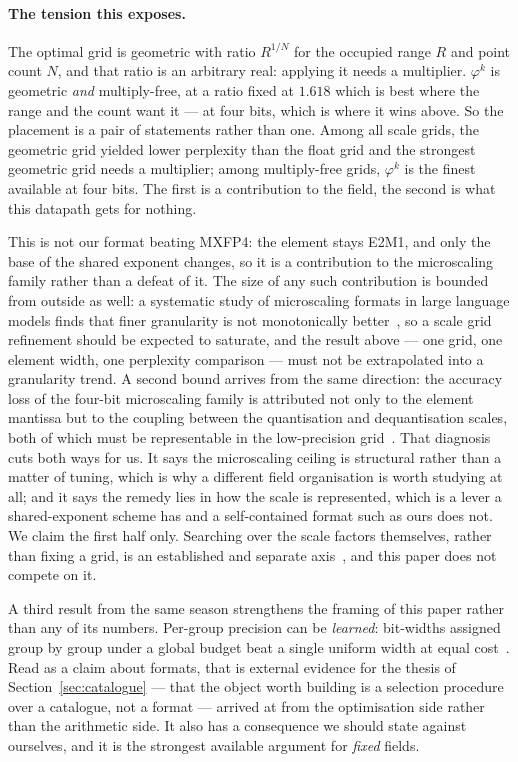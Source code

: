 \documentclass[11pt]{article}
\theoremstyle{definition}
\begin{document}
\paragraph{The tension this exposes.} The optimal grid is geometric with ratio
$R^{1/N}$ for the occupied range $R$ and point count $N$, and that ratio is an
arbitrary real: applying it needs a multiplier. $\varphi^{k}$ is geometric
\emph{and} multiply-free, at a ratio fixed at $1.618$ which is best where the
range and the count want it --- at four bits, which is where it wins above. So
the placement is a pair of statements rather than one. Among all scale grids,
the geometric grid yielded lower perplexity than the float grid and the strongest
geometric grid needs a multiplier; among
multiply-free grids, $\varphi^{k}$ is the finest available at four bits. The
first is a contribution to the field, the second is what this datapath gets for
nothing.

This is not our format beating MXFP4: the element stays
E2M1, and only the base of the shared exponent changes, so it is a contribution
to the microscaling family rather than a defeat of it. The size of any such
contribution is bounded from outside as well: a systematic study of microscaling
formats in large language models finds that finer granularity is not monotonically
better~\cite{fasoli2026}, so a scale grid refinement should be expected to
saturate, and the result above --- one grid, one element width, one perplexity
comparison --- must not be extrapolated into a granularity trend. A second bound
arrives from the same direction: the accuracy loss of the four-bit microscaling
family is attributed not only to the element mantissa but to the coupling between
the quantisation and dequantisation scales, both of which must be representable in
the low-precision grid~\cite{yan2026focus}. That diagnosis cuts both ways for us.
It says the microscaling ceiling is structural rather than a matter of tuning,
which is why a different field organisation is worth studying at all; and it says
the remedy lies in how the scale is represented, which is a lever a shared-exponent
scheme has and a self-contained format such as ours does not. We claim the first
half only. Searching over
the scale factors themselves, rather than fixing a grid, is an established and
separate axis~\cite{gupta2026scalesearch}, and this paper does not compete on it.

A third result from the same season strengthens the framing of this paper rather
than any of its numbers. Per-group precision can be \emph{learned}: bit-widths
assigned group by group under a global budget beat a single uniform width at equal
cost~\cite{ogilvy2026variable}. Read as a claim about formats, that is external
evidence for the thesis of Section~\ref{sec:catalogue} --- that the object worth
building is a selection procedure over a catalogue, not a format --- arrived at from
the optimisation side rather than the arithmetic side. It also has a consequence we
should state against ourselves, and it is the strongest available argument for
\emph{fixed} fields.
\end{document}
